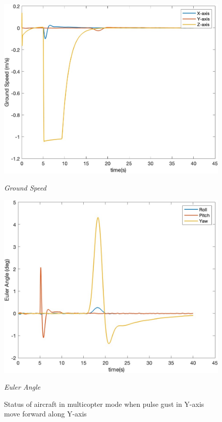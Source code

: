 \begin{figure}[htbp]
\begin{minipage}[b]{0.45\textwidth}
    \centering
    \includegraphics[width=\textwidth]{Images/Gust/VTOL pulse/3 groundspeed_5.jpg}
    \caption*{\textit{Ground Speed}}
  \end{minipage}
  \hfil
  \begin{minipage}[b]{0.45\textwidth}
    \centering
    \includegraphics[width=\textwidth]{Images/Gust/VTOL pulse/4 EulerAngle_5.jpg}
    \caption*{\textit{Euler Angle}}
  \end{minipage}
  \caption{Status of aircraft in multicopter mode when pulse gust in Y-axis move forward along Y-axis}
  \label{fig:VTOL pulse yy}
\end{figure}

